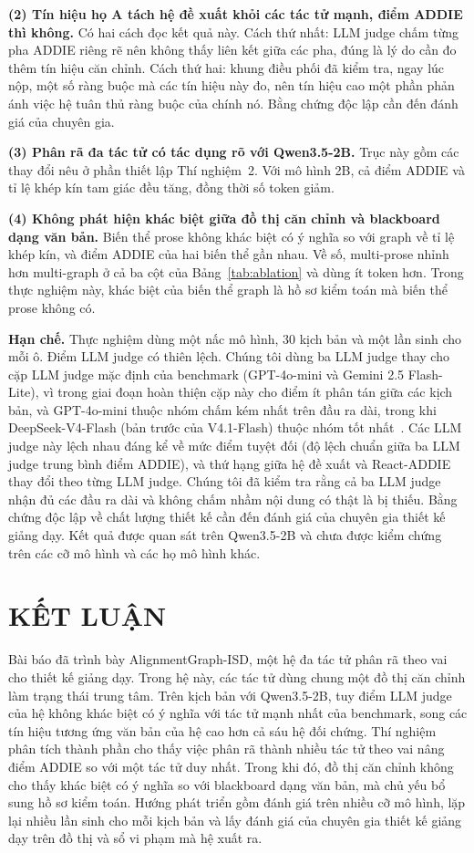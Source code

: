 \documentclass[conference,a4paper]{IEEEtran}
\begin{document}
\textbf{(2) Tín hiệu họ A tách hệ đề xuất khỏi các tác tử mạnh, điểm ADDIE thì không.} Có hai cách đọc
kết quả này. Cách thứ nhất: LLM judge chấm từng pha ADDIE riêng rẽ nên không thấy
liên kết giữa các pha, đúng là lý do cần đo thêm tín hiệu căn chỉnh. Cách thứ hai: khung điều phối đã kiểm tra, ngay lúc nộp, một số ràng buộc mà các tín hiệu này đo, nên tín hiệu cao một phần phản ánh việc hệ tuân thủ ràng buộc của chính nó.
Bằng chứng độc lập cần đến đánh giá của chuyên gia.

\textbf{(3) Phân rã đa tác tử có tác dụng rõ với Qwen3.5-2B.} Trục này gồm các thay đổi nêu ở phần thiết lập Thí nghiệm~2. Với mô hình 2B, cả điểm ADDIE và
tỉ lệ khép kín tam giác đều tăng, đồng thời số token giảm.

\textbf{(4) Không phát hiện khác biệt giữa đồ thị căn chỉnh và blackboard dạng văn bản.} Biến thể prose không khác biệt có ý nghĩa so với graph về tỉ lệ khép kín, và điểm ADDIE của hai biến thể gần nhau. Về số, multi-prose nhỉnh hơn multi-graph ở cả ba cột
của Bảng~\ref{tab:ablation} và dùng ít token hơn. Trong thực nghiệm này, khác biệt của biến thể graph là hồ sơ kiểm toán mà biến thể prose không có.

\textbf{Hạn chế.} Thực nghiệm dùng một nấc mô hình, 30 kịch bản và một lần sinh cho
mỗi ô. Điểm LLM judge có thiên lệch. Chúng tôi dùng ba LLM judge thay cho cặp LLM
judge mặc định của benchmark (GPT-4o-mini và Gemini 2.5 Flash-Lite), vì trong giai đoạn hoàn
thiện cặp này cho điểm ít phân tán giữa các kịch bản, và GPT-4o-mini thuộc nhóm chấm kém nhất trên
đầu ra dài, trong khi DeepSeek-V4-Flash (bản trước của V4.1-Flash) thuộc nhóm tốt
nhất~\cite{chen2026longjudgebench}. Các LLM judge này lệch nhau đáng kể về mức điểm tuyệt
đối (độ lệch chuẩn giữa ba LLM judge trung bình \JudgeSD{} điểm ADDIE), và thứ hạng giữa hệ đề
xuất và React-ADDIE thay đổi theo từng LLM judge. Chúng
tôi đã kiểm tra rằng cả ba LLM judge nhận đủ các đầu ra dài và không chấm nhầm nội dung
có thật là bị thiếu. Bằng chứng độc lập về chất lượng thiết kế cần đến đánh giá
của chuyên gia thiết kế giảng dạy. Kết quả được quan sát trên Qwen3.5-2B và chưa
được kiểm chứng trên các cỡ mô hình và các họ mô hình khác.

\section{KẾT LUẬN}
\label{sec:conclusion}
Bài báo đã trình bày AlignmentGraph-ISD, một hệ đa tác tử phân rã theo vai cho
thiết kế giảng dạy. Trong hệ này, các tác tử dùng chung một đồ thị căn chỉnh làm
trạng thái trung tâm. Trên \NScenCmp{} kịch bản với Qwen3.5-2B, tuy điểm LLM judge của hệ không khác biệt có ý nghĩa với tác tử mạnh nhất của
benchmark, song các tín hiệu tương ứng văn bản của hệ cao hơn cả sáu hệ đối
chứng. Thí nghiệm phân tích thành phần cho thấy việc phân rã thành nhiều tác tử theo vai
nâng điểm ADDIE so với một tác tử duy nhất. Trong khi đó, đồ thị căn chỉnh không cho thấy khác biệt có ý nghĩa so với blackboard
dạng văn bản, mà chủ yếu bổ sung hồ sơ kiểm toán. Hướng phát triển gồm đánh giá trên nhiều cỡ mô hình,
lặp lại nhiều lần sinh cho mỗi kịch bản và lấy đánh giá của chuyên gia thiết kế
giảng dạy trên đồ thị và sổ vi phạm mà hệ xuất ra.



\end{document}
